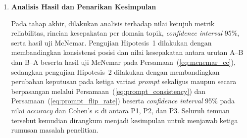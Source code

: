 \begin{enumerate}
  Pada tahap kelima, dilakukan ekstraksi keputusan dari teks keluaran model pada setiap skenario inferensi menggunakan pola \textit{regular expression} (\textit{word-boundary regex}) untuk mengambil pilihan satu huruf (\texttt{A} atau \texttt{B}). Apabila keluaran model tidak memuat salah satu huruf tersebut secara jelas, skenario ditandai sebagai \textit{invalid}, dihitung proporsinya ke dalam \textit{invalid rate}, dan dipisahkan tanpa dimasukkan ke salah satu pilihan jawaban \cite{raoAgreementMetricsLLMasJudge2026}. Keputusan biner yang valid selanjutnya dipetakan kembali ke jawaban aslinya sesuai Tabel~\ref{tab:skema_pertukaran_posisi} untuk menghitung metrik kesepakatan terhadap preferensi manusia (\textit{accuracy} dan Cohen's $\kappa$), konsistensi serta arah bias posisi (\textit{position consistency}, \textit{preference flip rate}, dan \textit{first-position preference rate}), serta konsistensi lintas variasi \textit{prompt} (\textit{prompt consistency} dan \textit{prompt flip rate}).

  \item \textbf{Analisis Hasil dan Penarikan Kesimpulan}

  Pada tahap akhir, dilakukan analisis terhadap nilai ketujuh metrik reliabilitas, rincian kesepakatan per domain topik, \textit{confidence interval} 95\%, serta hasil uji McNemar. Pengujian Hipotesis~1 dilakukan dengan membandingkan konsistensi posisi dan nilai kesepakatan antara urutan A--B dan B--A beserta hasil uji McNemar pada Persamaan~(\ref{eq:mcnemar_cc}), sedangkan pengujian Hipotesis~2 dilakukan dengan membandingkan perubahan keputusan pada ketiga variasi \textit{prompt} sekaligus maupun secara berpasangan melalui Persamaan~(\ref{eq:prompt_consistency}) dan Persamaan~(\ref{eq:prompt_flip_rate}) beserta \textit{confidence interval} 95\% pada nilai \textit{accuracy} dan Cohen's $\kappa$ di antara P1, P2, dan P3. Seluruh temuan tersebut kemudian dirangkum menjadi kesimpulan untuk menjawab ketiga rumusan masalah penelitian.
  \end{enumerate}
\newpage
